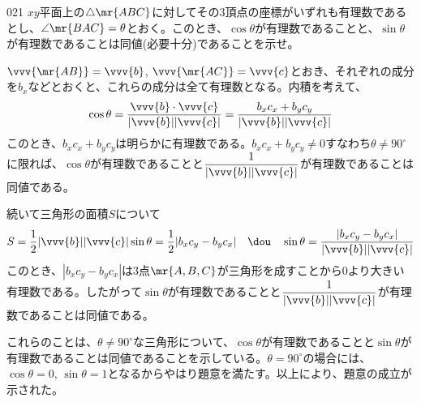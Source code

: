 \begin{prob}{021}{}{}
 $xy$平面上の$\triangle\mr{ABC}$に対してその3頂点の座標がいずれも有理数であるとし、$\angle\mr{BAC}=\theta$とおく。このとき、$\cos\theta$が有理数であることと、$\sin\theta$が有理数であることは同値(必要十分)であることを示せ。
\end{prob}
$\vvv{\mr{AB}}=\vvv{b}$, $\vvv{\mr{AC}}=\vvv{c}$とおき、それぞれの成分を$b_x$などとおくと、これらの成分は全て有理数となる。内積を考えて、
\[ \cos\theta=\frac{\vvv{b}\cdot\vvv{c}}{|\vvv{b}||\vvv{c}|}=\frac{b_xc_x+b_yc_y}{|\vvv{b}||\vvv{c}|} \]
このとき、$b_xc_x+b_yc_y$は明らかに有理数である。$b_xc_x+b_yc_y\neq 0$すなわち$\theta\neq 90^\circ$に限れば、$\cos\theta$が有理数であることと$\dfrac{1}{|\vvv{b}||\vvv{c}|}$が有理数であることは同値である。

続いて三角形の面積$S$について
\[ S=\frac{1}{2}|\vvv{b}||\vvv{c}|\sin\theta=\frac{1}{2}|b_xc_y-b_yc_x| \quad\dou\quad \sin\theta=\frac{|b_xc_y-b_yc_x|}{|\vvv{b}||\vvv{c}|} \]
このとき、$|b_xc_y-b_yc_x|$は3点$\mr{A,B,C}$が三角形を成すことから0より大きい有理数である。したがって$\sin\theta$が有理数であることと$\dfrac{1}{|\vvv{b}||\vvv{c}|}$が有理数であることは同値である。

これらのことは、$\theta\neq 90^\circ$な三角形について、$\cos\theta$が有理数であることと$\sin\theta$が有理数であることは同値であることを示している。$\theta=90^\circ$の場合には、$\cos\theta=0$, $\sin\theta=1$となるからやはり題意を満たす。以上により、題意の成立が示された。